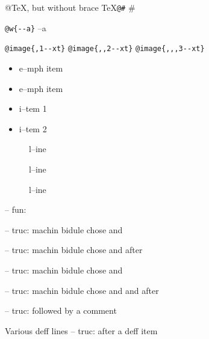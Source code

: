 \documentclass{book}
\begin{document}
@TeX, but without brace \TeX{}\texttt{@\#} \#

\texttt{@w\{{-}{-}a\}} \hbox{--a}

\texttt{@image\{,1{-}{-}xt\}} 
\texttt{@image\{,,2{-}{-}xt\}} 
\texttt{@image\{,,,3{-}{-}xt\}} 


\begin{itemize}[label=\emph{}]
\item e--mph item
\end{itemize}

\begin{itemize}[label=\emph{} after emph]
\item e--mph item
\end{itemize}

\begin{itemize}[label=\textbullet{} a--n itemize line]
\item i--tem 1
\item i--tem 2
\end{itemize}

\begin{description}
\item[{\parbox[b]{\linewidth}{%
a}}]
l--ine
\end{description}

\begin{description}
\item[{\parbox[b]{\linewidth}{%
a--missing style formatting}}]
l--ine
\end{description}

\begin{description}
\item[{\parbox[b]{\linewidth}{%
a\\
\index[fn]{a@\texttt{a}}%
\index[cp]{index entry between item and itemx}%
b
\index[fn]{b@\texttt{b}}%
}}]
l--ine
\end{description}

\hbox{}-- fun: 


\hbox{}-- truc: machin bidule chose and


%
\hbox{}-- truc: machin bidule chose and  after


%
\hbox{}-- truc: machin bidule chose and 


%
\hbox{}-- truc: machin bidule chose and and after


%
\hbox{}-- truc: followed by a comment


%
Various deff lines
\hbox{}-- truc: after a deff item
\end{document}
